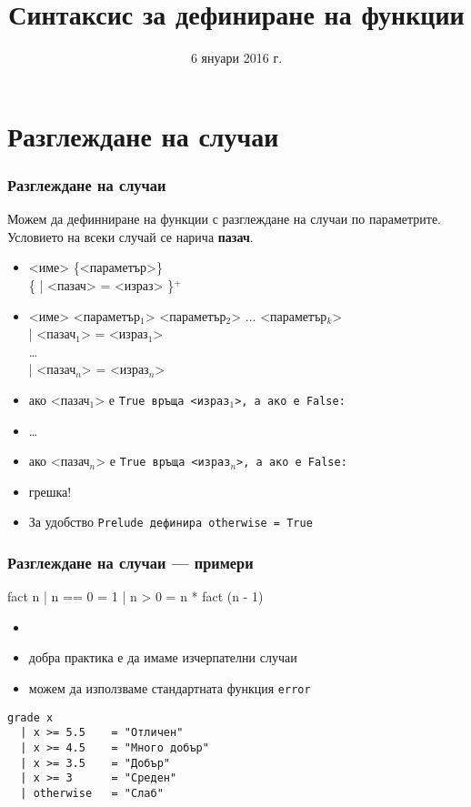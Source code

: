 \documentclass{beamer}
\title{Синтаксис за дефиниране на функции}
\date{6 януари 2016 г.}
\begin{document}
\begin{frame}
  \titlepage
\end{frame}


\section{Разглеждане на случаи}

\begin{frame}[fragile]
  \frametitle{Разглеждане на случаи}
  Можем да дефинниране на функции с разглеждане на случаи по параметрите.\\
  Условието на всеки случай се нарича \textbf{пазач}.
  \begin{itemize}
    \item{} <име> \{<параметър>\}\\
      \hspace{3ex} \{ \tta| <пазач> \tta= <израз> \}$^+$
      \pause
    \item{} <име> <параметър$_1$> <параметър$_2$> ... <параметър$_k$>\\
      \hspace{3ex} \tta| <пазач$_1$> \tta= <израз$_1$>\\
      \hspace{3ex} \ldots\\
      \hspace{3ex} \tta| <пазач$_n$> \tta= <израз$_n$>\\
      \pause
    \item ако <пазач$_1$> е \tt{True} връща <израз$_1$>, а ако е \tt{False}:
    \item \ldots
    \item ако <пазач$_n$> е \tt{True} връща <израз$_n$>, а ако е \tt{False}:
    \item \alert{грешка!}
      \pause
    \item За удобство \tt{Prelude} дефинира \tt{otherwise = True}
  \end{itemize}
\end{frame}

\begin{frame}[fragile]
  \frametitle{Разглеждане на случаи --- примери}
\begin{semiverbatim}
fact n
  | n == 0    = 1
  | n > 0     = n * fact (n - 1)
\end{semiverbatim}
\onslide<+->
\begin{itemize}[<+->]
\item {}
\item добра практика е да имаме изчерпателни случаи
\item можем да използваме стандартната функция \tt{error}
\end{itemize}
\onslide<+->
\onslide<+->
\begin{verbatim}
grade x
  | x >= 5.5    = "Отличен"
  | x >= 4.5    = "Много добър"
  | x >= 3.5    = "Добър"
  | x >= 3      = "Среден"
  | otherwise   = "Слаб"
\end{verbatim}
\end{frame}
\end{document}
